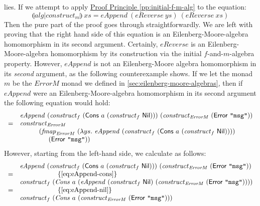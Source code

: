 \documentclass{jfp1}
\newcommand{\eFold}[2]{\llparenthesis #1|#2 \rrparenthesis}
\newcommand{\eqAnnotation}[1]{\hspace{2cm}\left\{\textrm{#1}\right\}}
\newcommand{\proofprinref}[1]{\hyperref[#1]{Proof Principle \ref*{#1}}}
\begin{document}
lies. If we attempt to apply \proofprinref{pp:initial-f-m-alg} to the
equation:
\begin{displaymath}
  \eFold{\mathit{alg}}{\mathit{construct}_m}~\mathit{xs} = \mathit{eAppend}~(\mathit{eReverse}~\mathit{ys})~(\mathit{eReverse}~\mathit{xs})
\end{displaymath}
Then the pure part of the proof goes through straightforwardly. We are
left with proving that the right hand side of this equation is an
Eilenberg-Moore-algebra homomorphism in its second
argument. Certainly, $\mathit{eReverse}$ is an Eilenberg-Moore-algebra
homomorphism by its construction via the initial $f$-and-$m$-algebra
property. However, $\mathit{eAppend}$ is not an Eilenberg-Moore
algebra homomorphism in its \emph{second} argument, as the following
counterexample shows. If we let the monad $m$ be the $\mathit{ErrorM}$
monad we defined in \autoref{sec:eilenberg-moore-algebras}, then if
$\mathit{eAppend}$ were an Eilenberg-Moore-algebra homomorphism in its
second argument the following equation would hold:
\begin{equation}\label{eq:purported-em}
  \begin{array}{cl}
    &\mathit{eAppend}~(\mathit{construct}_f~(\mathsf{Cons}~a~(\mathit{construct}_f~\mathsf{Nil})))~(\mathit{construct}_{\mathit{ErrorM}}~(\mathsf{Error}~\texttt{"msg"})) \\
    =&\mathit{construct}_{\mathit{ErrorM}}~\\
    & \hspace{1cm}(\mathit{fmap}_{\mathit{ErrorM}}~(\lambda ys.~\mathit{eAppend}~(\mathit{construct}_f~(\mathsf{Cons}~a~(\mathit{construct}_f~\mathsf{Nil}))))~\\
    & \hspace{1.5cm}(\mathsf{Error}~\texttt{"msg"}))
  \end{array}
\end{equation}
However, starting from the left-hand side, we calculate as follows:
\begin{displaymath}
  \begin{array}{cl}
    & \mathit{eAppend}~(\mathit{construct}_f~(\mathsf{Cons}~a~(\mathit{construct}_f~\mathsf{Nil})))~(\mathit{construct}_{\mathit{ErrorM}}~(\mathsf{Error}~\texttt{"msg"})) \\
    =&\eqAnnotation{\autoref{eq:eAppend-cons}} \\
    & \mathit{construct}_f~(\mathit{Cons}~a~(\mathit{eAppend}~(\mathit{construct}_f~\mathsf{Nil})~(\mathit{construct}_{\mathit{ErrorM}}~(\mathsf{Error}~\texttt{"msg"})))) \\
    =&\eqAnnotation{\autoref{eq:eAppend-nil}} \\
    & \mathit{construct}_f~(\mathit{Cons}~a~(\mathit{construct}_{\mathit{ErrorM}}~(\mathsf{Error}~\texttt{"msg"})))
  \end{array}
\end{displaymath}
\end{document}
